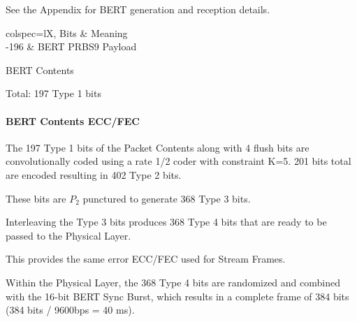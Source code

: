 \documentclass[a4paper,11pt]{book}
\begin{document}
See the Appendix for BERT generation and reception details.

\begin{table}[H]
	\centering
	\begin{tblr}{
		colspec={lX},
		}
		\hline
		Bits & Meaning \\
		-196 & BERT PRBS9 Payload \\
		\hline[2px]
	\end{tblr}
	\caption{BERT Contents}
\end{table}

Total: 197 Type 1 bits

\paragraph{BERT Contents ECC/FEC}

The 197 Type 1 bits of the Packet Contents along with 4 flush bits are convolutionally coded using a rate 1/2 coder with constraint K=5. 201 bits total are encoded resulting in 402 Type 2 bits.

These bits are $P_2$ punctured to generate 368 Type 3 bits.

Interleaving the Type 3 bits produces 368 Type 4 bits that are ready to be passed to the Physical Layer.

This provides the same error ECC/FEC used for Stream Frames.

Within the Physical Layer, the 368 Type 4 bits are randomized and combined with the 16-bit BERT Sync Burst, which results in a complete frame of 384 bits (384 bits / 9600bps = 40 ms).
\end{document}

